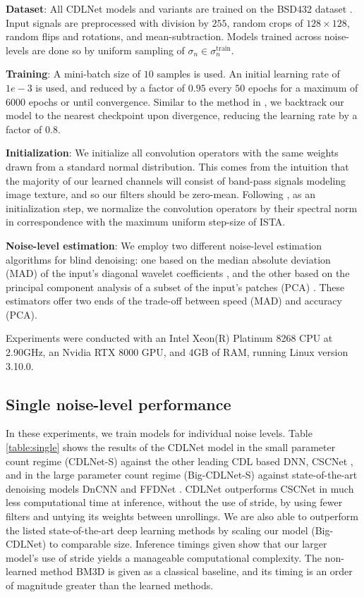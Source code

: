 \documentclass[conference]{IEEEtran}
\newcommand{\soa}{state-of-the-art }
\begin{document}
\textbf{Dataset}: All CDLNet models and variants are trained on the BSD432 dataset \cite{bsd}. Input signals are preprocessed with division by $255$, random crops of $128\times 128$, random flips and rotations, and mean-subtraction. Models trained across noise-levels are done so by uniform sampling of $\sigma_n \in \sigma_n^{\mathrm{train}}$.

\textbf{Training}: A mini-batch size of $10$ samples is used. An initial learning rate of $1e-3$ is used, and reduced by a factor of $0.95$ every $50$ epochs for a maximum of $6000$ epochs or until convergence. Similar to the method in \cite{Lecouat2020Games}, we backtrack our model to the nearest checkpoint upon divergence, reducing the learning rate by a factor of $0.8$. 

\textbf{Initialization}: We initialize all convolution operators with the same weights drawn from a standard normal distribution. This comes from the intuition that the majority of our learned channels will consist of band-pass signals modeling image texture, and so our filters should be zero-mean. Following \cite{Simon2019}, as an initialization step, we normalize the convolution operators by their spectral norm in correspondence with the maximum uniform step-size of ISTA.

\textbf{Noise-level estimation}: We employ two different noise-level estimation algorithms for blind denoising: one based on the median absolute deviation (MAD) of the input's diagonal wavelet coefficients \cite{Chang2000}, and the other based on the principal component analysis of a subset of the input's patches (PCA) \cite{Liu2013}. These estimators offer two ends of the trade-off between speed (MAD) and accuracy (PCA).

Experiments were conducted with an Intel Xeon(R) Platinum 8268 CPU at 2.90GHz, an Nvidia RTX 8000 GPU, and 4GB of RAM, running Linux version 3.10.0.

\subsection{Single noise-level performance} \label{sec:exp_single}
In these experiments, we train models for individual noise levels. Table \ref{table:single} shows the results of the CDLNet model in the small parameter count regime  (CDLNet-S) against the other leading CDL based DNN, CSCNet \cite{Simon2019}, and in the large parameter count regime (Big-CDLNet-S) against \soa denoising models DnCNN \cite{DnCNN} and FFDNet \cite{FFDNet}. CDLNet outperforms CSCNet in much less computational time at inference, without the use of stride, by using fewer filters and untying its weights between unrollings. We are also able to outperform the listed \soa deep learning methods by scaling our model (Big-CDLNet) to comparable size. Inference timings given show that our larger model's use of stride yields a manageable computational complexity. The non-learned method BM3D \cite{bm3d} is given as a classical baseline, and its timing is an order of magnitude greater than the learned methods.
\end{document}
